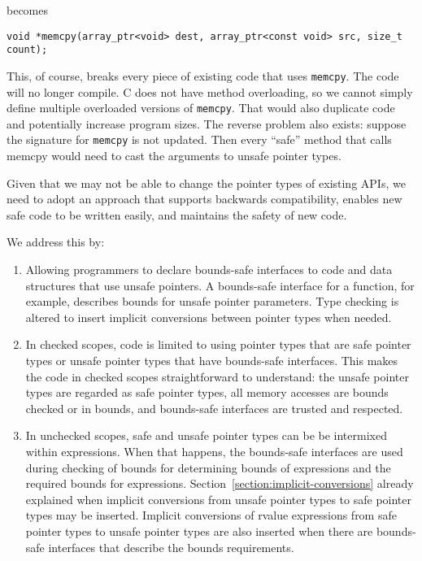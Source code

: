 becomes

\begin{verbatim}
void *memcpy(array_ptr<void> dest, array_ptr<const void> src, size_t count);
\end{verbatim}

This, of course, breaks every piece of existing code that uses \texttt{memcpy}.
The code will no longer compile. C does not have method overloading, so
we cannot simply define multiple overloaded versions of \texttt{memcpy}. That
would also duplicate code and potentially increase program sizes.
The reverse problem also exists: suppose the signature for \texttt{memcpy} is not
updated. Then every ``safe'' method that calls memcpy would need to cast
the arguments to unsafe pointer types.

Given that we may not be able to change the pointer types of existing
APIs, we need to adopt an approach that supports backwards
compatibility, enables new safe code to be written easily, and maintains
the safety of new code.

We address this by:

\begin{enumerate}
\item
  Allowing programmers to declare bounds-safe interfaces to code and
  data structures that use unsafe pointers. A bounds-safe interface for
  a function, for example, describes bounds for unsafe pointer
  parameters.   Type checking is altered to insert implicit conversions
  between pointer types when needed.
\item
  In checked scopes, code is limited to using pointer types that are 
  safe pointer types or unsafe pointer types that have bounds-safe interfaces.  
  This makes the code in checked scopes straightforward to understand:
  the unsafe pointer types are regarded as safe pointer types, all memory 
  accesses are bounds checked or in bounds, and bounds-safe interfaces are trusted
  and respected.
\item
  In unchecked scopes, safe and unsafe pointer types can be
  be intermixed within expressions.  When that happens, the bounds-safe
  interfaces are used during checking of bounds for determining bounds
  of expressions and the required bounds for expressions. 
  Section~\ref{section:implicit-conversions} already
  explained when implicit conversions from unsafe pointer types to safe pointer
  types may be inserted.   Implicit conversions of rvalue expressions 
  from safe pointer types to unsafe pointer types are also inserted when
  there are bounds-safe interfaces that describe the bounds requirements.
\end{enumerate}

